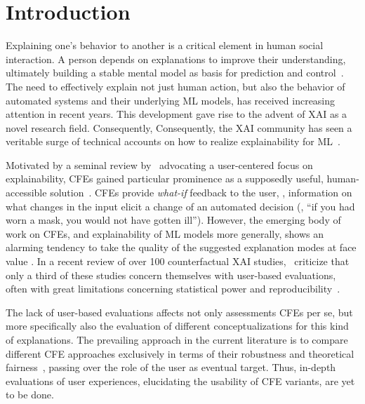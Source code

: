 \section{Introduction}\label{sec:introduction}

Explaining one's behavior to another is a critical element in human social interaction. 
A person depends on explanations to improve their understanding, ultimately building a stable mental model as basis for prediction and control~\citep{heider_psychology_1958}. 
The need to effectively explain not just human action, but also the behavior of automated systems and their underlying \gls{ML} models, has received increasing attention in recent years. This development gave rise to the advent of \gls{XAI} as a novel research field. Consequently, 
Consequently, the \gls{XAI} community has seen a veritable surge of technical accounts on how to realize explainability for \gls{ML}~\citep{guidotti_survey_2019}. 

Motivated by a seminal review by~\citep{miller_explanation_2019} advocating a user-centered focus on explainability, \glspl{CFE} gained particular prominence as a supposedly useful, human-accessible solution~\citep{keane_if_2021}.
\glspl{CFE} provide \textit{what-if} feedback to the user, \ie, information on what changes in the input elicit a change of an automated decision (\ie, ``if you had worn a mask, you would not have gotten ill''). 
However, the emerging body of work on \glspl{CFE}, and explainability of \gls{ML} models more generally, shows an alarming tendency to take the quality of the suggested explanation modes at face value \citep{doshi-velez_towards_2017, offert_i_2017}.
In a recent review of over 100 counterfactual XAI studies,~\citeauthor{keane_if_2021} criticize that only a third of these studies concern themselves with user-based evaluations, often with great limitations concerning statistical power and reproducibility~\citep{keane_if_2021}.

The lack of user-based evaluations affects not only assessments \glspl{CFE} per se, but more specifically also the evaluation of different conceptualizations for this kind of explanations.
The prevailing approach in the current literature is to compare different \gls{CFE} approaches exclusively in terms of their robustness and theoretical fairness~\citep{artelt_evaluating_2021}, passing over the role of the user as eventual target.  
Thus, in-depth evaluations of user experiences, elucidating the usability of \gls{CFE} variants, are yet to be done.

